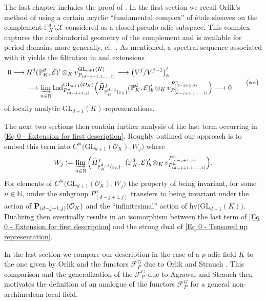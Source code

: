 \documentclass[a4paper, reqno, 10pt]{amsart}
\theoremstyle{definition}
\numberwithin{equation}{section}
\newcommand{\botimes}[1]{{\,\otimes_{#1}\,}}
\newcommand{\defeq}{\vcentcolon=}
\newcommand{\GL}{{\mathrm{GL}}}
\newcommand{\hy}{{\mathrm{hy}}}
\newcommand{\Ind}{{\mathrm{Ind}}}
\newcommand{\la}{{\mathrm{la}}}
\newcommand{\lra}{\longrightarrow}
\newcommand{\BN}{{\mathbb {N}}}
\newcommand{\BP}{{\mathbb {P}}}
\newcommand{\CE}{{\mathcal {E}}}
\newcommand{\CF}{{\mathcal {F}}}
\newcommand{\CO}{{\mathcal {O}}}
\newcommand{\CX}{{\mathcal {X}}}
\newcommand{\bP}{{\mathrm{\bf P}}}
\begin{document}
The last chapter includes the proof of .
In the first section we recall Orlik's method of using a certain acyclic ``fundamental complex'' of \'etale sheaves on the complement $\BP_K^d \setminus \CX$ considered as a closed pseudo-adic subspace.
This complex captures the combinatorial geometry of the complement and is available for period domains more generally, cf.\ \cite{Orlik05CohomPerDomRedGrpLocF}.
As mentioned, a spectral sequence associated with it yields the filtration in  and extensions
\begin{equation}\label{Eq 0 - Extension for first description}
	\begin{aligned}
		0 \lra &{\hspace{2pt}} H^j (\BP_K^d, \CE)' \botimes{K} v^{\GL_{d+1}(K)}_{P_{(d-j+1,1,\ldots,1)}}  \lra \big( V^j/V^{j-1} \big)'_b\\
		&\lra  \varinjlim_{n\in \BN} \Ind^{\GL_{d+1}(\CO_K)}_{P^n_{(d-j+1,j)}} \Big( \widetilde{H}^j_{\BP_K^{d-j} (\varepsilon_n)} (\BP_K^d, \CE)'_b \botimes{K} v^{P^n_{(d-j+1,j)}}_{P^n_{(d-j+1,1,\ldots,1)}} \Big) \lra 0
	\end{aligned} \tag{$\ast \ast$}
\end{equation}
of locally analytic $\GL_{d+1}(K)$-representations.



The next two sections then contain further analysis of the last term occurring in \eqref{Eq 0 - Extension for first description}.
Roughly outlined our approach is to embed this term into $C^\la \big(\GL_{d+1}(\CO_K), W_j \big)$ where 
\begin{equation*}
	W_j \defeq \varinjlim_{n\in \BN} \Big( \widetilde{H}^j_{\BP_K^{d-j} (\varepsilon_n)^-} (\BP_K^d, \CE)'_b \botimes{K} v^{P^n_{(d-j+1,j)}}_{P^n_{(d-j+1,1,\ldots,1)}} \Big).
\end{equation*}
For elements of $C^\la \big(\GL_{d+1}(\CO_K), W_j \big)$ the property of being invariant, for some $n\in \BN$, under the subgroup $P^n_{(d-j+1,j)}$ transfers to being invariant under the action of $\bP_{(d-j+1,j)}(\CO_K)$ and the ``infinitesimal'' action of $\hy\big( \GL_{d+1}(K)\big)$.
Dualizing then eventually results in an isomorphism between the last term of \eqref{Eq 0 - Extension for first description} and the strong dual of \eqref{Eq 0 - Tensored up representation}.



In the last section we compare our description in the case of a $p$-adic field $K$ to the one given by Orlik \cite{Orlik08EquivVBDrinfeldUpHalfSp} and the functors $\CF^G_P$ due to Orlik and Strauch \cite{OrlikStrauch15JordanHoelderSerLocAnRep}.
This comparison and the generalization of the $\CF^G_P$ due to Agrawal and Strauch \cite{AgrawalStrauch22FromCatOLocAnRep} then motivates the definition of an analogue of the functors $\CF^G_P$ for a general non-archimedean local field.
\end{document}
